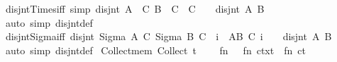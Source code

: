 \begin{isabellebody}
\endisatagproof
{\isafoldproof}%
%
\isadelimproof
\isanewline
%
\endisadelimproof
\isanewline
{}\isamarkupfalse%
\ disjnt{\isacharunderscore}{\kern0pt}Times{}{\isacharunderscore}{\kern0pt}iff\ {\isacharbrackleft}{\kern0pt}simp{\isacharbrackright}{\kern0pt}{\isacharcolon}{\kern0pt}\ {\isachardoublequoteopen}disjnt\ {\isacharparenleft}{\kern0pt}A\ {\isasymtimes}\ C{\isacharparenright}{\kern0pt}\ {\isacharparenleft}{\kern0pt}B\ {\isasymtimes}\ C{\isacharparenright}{\kern0pt}\ {\isasymlongleftrightarrow}\ C\ {\isacharequal}{\kern0pt}\ {\isacharbraceleft}{\kern0pt}{\isacharbraceright}{\kern0pt}\ {\isasymor}\ disjnt\ A\ B{\isachardoublequoteclose}\isanewline
%
\isadelimproof
\ \ %
\endisadelimproof
%
\isatagproof
{}\isamarkupfalse%
\ {\isacharparenleft}{\kern0pt}auto\ simp{\isacharcolon}{\kern0pt}\ disjnt{\isacharunderscore}{\kern0pt}def{\isacharparenright}{\kern0pt}%
\endisatagproof
{\isafoldproof}%
%
\isadelimproof
\isanewline
%
\endisadelimproof
\isanewline
{}\isamarkupfalse%
\ disjnt{\isacharunderscore}{\kern0pt}Sigma{\isacharunderscore}{\kern0pt}iff{\isacharcolon}{\kern0pt}\ {\isachardoublequoteopen}disjnt\ {\isacharparenleft}{\kern0pt}Sigma\ A\ C{\isacharparenright}{\kern0pt}\ {\isacharparenleft}{\kern0pt}Sigma\ B\ C{\isacharparenright}{\kern0pt}\ {\isasymlongleftrightarrow}\ {\isacharparenleft}{\kern0pt}{\isasymforall}i\ {\isasymin}\ A{\isasyminter}B{\isachardot}{\kern0pt}\ C\ i\ {\isacharequal}{\kern0pt}\ {\isacharbraceleft}{\kern0pt}{\isacharbraceright}{\kern0pt}{\isacharparenright}{\kern0pt}\ {\isasymor}\ disjnt\ A\ B{\isachardoublequoteclose}\isanewline
%
\isadelimproof
\ \ %
\endisadelimproof
%
\isatagproof
{}\isamarkupfalse%
\ {\isacharparenleft}{\kern0pt}auto\ simp{\isacharcolon}{\kern0pt}\ disjnt{\isacharunderscore}{\kern0pt}def{\isacharparenright}{\kern0pt}%
\endisatagproof
{\isafoldproof}%
%
\isadelimproof
%
\endisadelimproof
%
\isadelimdocument
%
\endisadelimdocument
%
\isatagdocument
%
\isamarkuptrue%
%
\endisatagdocument
{\isafolddocument}%
%
\isadelimdocument
%
\endisadelimdocument
%
\isadelimML
%
\endisadelimML
%
\isatagML
{}\isamarkupfalse%
\ Collect{\isacharunderscore}{\kern0pt}mem\ {\isacharparenleft}{\kern0pt}{\isachardoublequoteopen}Collect\ t{\isachardoublequoteclose}{\isacharparenright}{\kern0pt}\ {\isacharequal}{\kern0pt}\ {\isacartoucheopen}\isanewline
\ \ fn\ {\isacharunderscore}{\kern0pt}\ {\isacharequal}{\kern0pt}{\isachargreater}{\kern0pt}\ fn\ ctxt\ {\isacharequal}{\kern0pt}{\isachargreater}{\kern0pt}\ fn\ ct\ {\isacharequal}{\kern0pt}{\isachargreater}{\kern0pt}\isanewline

\end{isabellebody}
